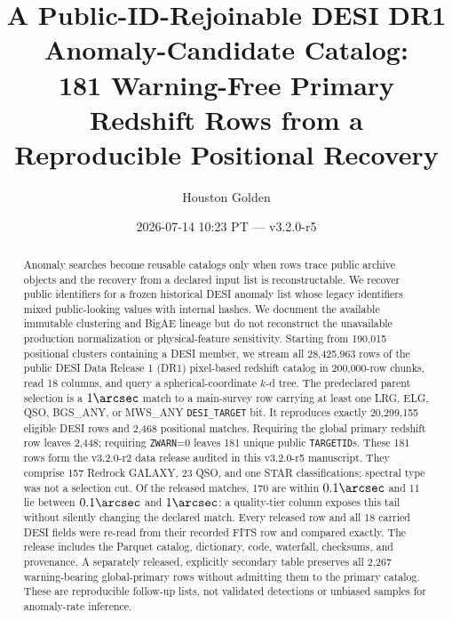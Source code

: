 \documentclass[twocolumn]{aastex701}
\newcommand{\paperVersion}{v3.2.0-r5}
\newcommand{\paperTimestamp}{2026-07-14 10:23 PT}
\newcommand{\releaseVersion}{v3.2.0-r2}
\begin{document}
\title{A Public-ID-Rejoinable DESI DR1 Anomaly-Candidate Catalog:\\
181 Warning-Free Primary Redshift Rows from a Reproducible Positional Recovery}

\author{Houston Golden}
\date{\paperTimestamp{} --- \paperVersion}

\begin{abstract}
Anomaly searches become reusable catalogs only when rows trace public archive objects and the
recovery from a declared input list is reconstructable.  We recover public identifiers for a
frozen historical DESI anomaly list whose legacy identifiers mixed public-looking values with
internal hashes.  We document the available immutable clustering and BigAE lineage but do not
reconstruct the unavailable production normalization or physical-feature sensitivity.  Starting
from 190,015 positional clusters containing a DESI member, we stream all 28,425,963 rows of the
public DESI Data Release 1 (DR1) pixel-based redshift catalog in 200,000-row chunks, read 18
columns, and query a spherical-coordinate $k$-d tree.  The predeclared parent selection is a
$1\arcsec$ match to a main-survey row carrying at least one LRG, ELG, QSO, BGS\_ANY, or MWS\_ANY
\texttt{DESI\_TARGET} bit.  It reproduces exactly 20,299,155 eligible DESI rows and 2,468
positional matches.  Requiring the global primary redshift row leaves 2,448; requiring
\texttt{ZWARN}=0 leaves 181 unique public \texttt{TARGETID}s.  These 181 rows form the
\releaseVersion{} data release audited in this \paperVersion{} manuscript.  They comprise 157
Redrock GALAXY, 23 QSO, and one STAR classifications; spectral type
was not a selection cut.  Of the released matches, 170 are within
$0.1\arcsec$ and 11 lie between $0.1\arcsec$ and $1\arcsec$; a quality-tier column exposes this
tail without silently changing the declared match.  Every released row and all 18 carried DESI
fields were re-read from their recorded FITS row and compared exactly.  The release includes the
Parquet catalog, dictionary, code, waterfall, checksums, and provenance.  A separately released,
explicitly secondary table preserves all 2,267 warning-bearing global-primary rows without
admitting them to the primary catalog.  These are reproducible follow-up lists, not validated
detections or unbiased samples for anomaly-rate inference.
\end{abstract}

\end{document}
